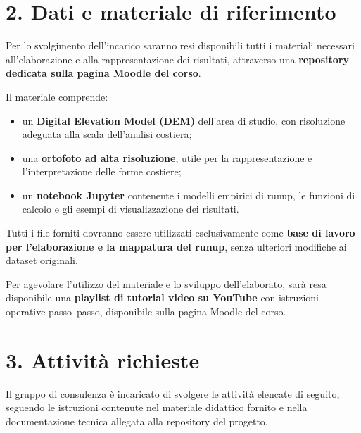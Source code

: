 \documentclass[11pt,a4paper,roman]{moderncv}
\begin{document}
\section*{2. Dati e materiale di riferimento}
Per lo svolgimento dell’incarico saranno resi disponibili tutti i materiali necessari all’elaborazione e alla rappresentazione dei risultati, attraverso una \textbf{repository dedicata sulla pagina Moodle del corso}.

Il materiale comprende:
\begin{itemize}
  \item un \textbf{Digital Elevation Model (DEM)} dell’area di studio, con risoluzione adeguata alla scala dell’analisi costiera;
  \item una \textbf{ortofoto ad alta risoluzione}, utile per la rappresentazione e l’interpretazione delle forme costiere;
  \item un \textbf{notebook Jupyter} contenente i modelli empirici di runup, le funzioni di calcolo e gli esempi di visualizzazione dei risultati.
\end{itemize}

Tutti i file forniti dovranno essere utilizzati esclusivamente come \textbf{base di lavoro per l’elaborazione e la mappatura del runup}, senza ulteriori modifiche ai dataset originali.

Per agevolare l’utilizzo del materiale e lo sviluppo dell’elaborato, sarà resa disponibile una \textbf{playlist di tutorial video su YouTube} con istruzioni operative passo–passo, disponibile sulla pagina Moodle del corso.

\section*{3. Attività richieste}
Il gruppo di consulenza è incaricato di svolgere le attività elencate di seguito, seguendo le istruzioni contenute nel materiale didattico fornito e nella documentazione tecnica allegata alla repository del progetto.
\end{document}
